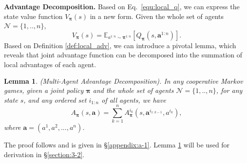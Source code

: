 \documentclass[11pt]{article}
\theoremstyle{plain}
\newtheorem{lemma}{Lemma}
\theoremstyle{remark}
\begin{document}
\textbf{Advantage Decomposition.} Based on Eq.~\eqref{equ:local_q}, we can express the state value function $V_{\boldsymbol{\pi}}(s)$ in a new form. Given the whole set of agents $\mathcal{N}=\{1, .., n\}$,
\begin{equation*}
V_{\boldsymbol{\pi}}(s) = \mathbb{E}_{a^{1:n} \sim \boldsymbol{\pi}^{1:n}}\left[Q_{\boldsymbol{\pi}}(s, \boldsymbol{a}^{1:n})\right].
\end{equation*}
Based on Definition \ref{def:local_adv}, we can introduce a pivotal lemma, which reveals that joint advantage function can be decomposed into the summation of local advantages of each agent. 
\begin{lemma}
\label{lemma:adv_decomposition}
(Multi-Agent Advantage Decomposition). In any cooperative Markov games, given a joint policy $\boldsymbol{\pi}$ and the whole set of agents $\mathcal{N}=\{1, .., n\}$, for any state $s$, and any ordered set $i_{1:n}$ of all agents, we have
\begin{equation}
A_{\boldsymbol{\pi}}(s, \boldsymbol{a}) = \sum_{k=1}^{n}A_{\boldsymbol{\pi}}^{i_{k}}(s, \boldsymbol{a}^{i_{1:k-1}}, a^{i_k}),
\end{equation}
where $\boldsymbol{a} = (a^1, a^2, ..., a^n)$.
\end{lemma}
The proof follows \citet{kuba2022happo} and is given in \S\ref{appendix:a-1}. Lemma \ref{lemma:adv_decomposition} will be used for derivation in \S\ref{section:3-2}.

\end{document}
